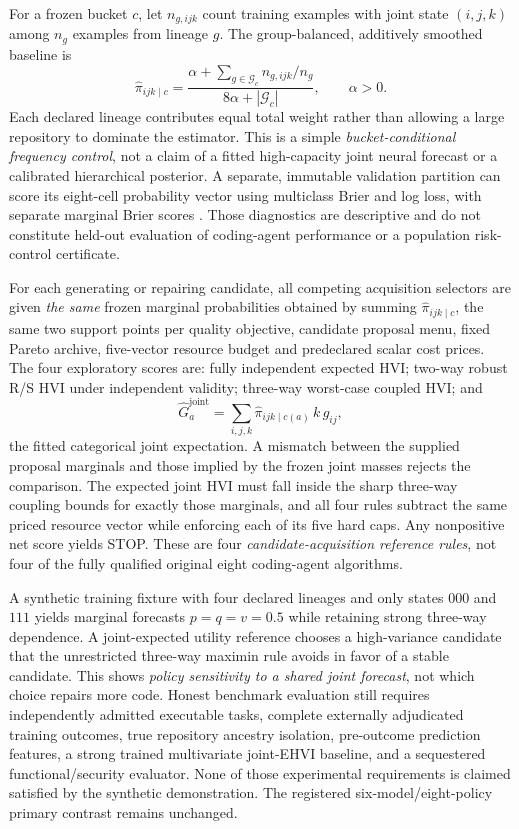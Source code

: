 \documentclass[pdflatex,sn-basic]{sn-jnl}
\begin{document}
For a frozen bucket $c$, let $n_{g,ijk}$ count training examples
with joint state $(i,j,k)$ among $n_g$ examples from lineage $g$.
The group-balanced, additively smoothed baseline is
\[
 \widehat\pi_{ijk\mid c}
 =\frac{\alpha+\sum_{g\in\mathcal G_c}n_{g,ijk}/n_g}
 {8\alpha+|\mathcal G_c|}, \qquad \alpha>0.
\]
Each declared lineage contributes equal total weight rather than
allowing a large repository to dominate the estimator. This is a
simple \emph{bucket-conditional frequency control}, not a claim
of a fitted high-capacity joint neural forecast or a calibrated
hierarchical posterior. A separate, immutable validation partition
can score its eight-cell probability vector using multiclass Brier
and log loss, with separate marginal Brier scores
\cite{gneiting2007scoring}. Those diagnostics are descriptive and
do not constitute held-out evaluation of coding-agent performance
or a population risk-control certificate.

For each generating or repairing candidate, all competing
acquisition selectors are given \emph{the same} frozen marginal
probabilities obtained by summing
$\widehat\pi_{ijk\mid c}$, the same two support points per quality
objective, candidate proposal menu, fixed Pareto archive,
five-vector resource budget and predeclared scalar cost prices.
The four exploratory scores are: fully independent expected HVI;
two-way robust R/S HVI under independent validity;
three-way worst-case coupled HVI; and
\[
 \widehat G^{\mathrm{joint}}_a
 =\sum_{i,j,k}\widehat\pi_{ijk\mid c(a)}\,k\,g_{ij},
\]
the fitted categorical joint expectation. A mismatch between
the supplied proposal marginals and those implied by the
frozen joint masses rejects the comparison. The expected
joint HVI must fall inside the sharp three-way
coupling bounds for exactly those marginals, and all four
rules subtract the same priced resource vector while enforcing
each of its five hard caps. Any nonpositive net score yields STOP.
These are four \emph{candidate-acquisition reference rules}, not
four of the fully qualified original eight coding-agent algorithms.

A synthetic training fixture with four declared lineages
and only states $000$ and $111$ yields marginal forecasts
$p=q=v=0.5$ while retaining strong three-way dependence.
A joint-expected utility reference chooses a high-variance
candidate that the unrestricted three-way maximin rule avoids
in favor of a stable candidate. This shows \emph{policy
sensitivity to a shared joint forecast}, not which choice
repairs more code. Honest benchmark evaluation still requires
independently admitted executable tasks, complete externally
adjudicated training outcomes, true repository ancestry isolation,
pre-outcome prediction features, a strong trained multivariate
joint-EHVI baseline, and a sequestered functional/security
evaluator. None of those experimental requirements is claimed
satisfied by the synthetic demonstration. The registered
six-model/eight-policy primary contrast remains unchanged.
\end{document}
